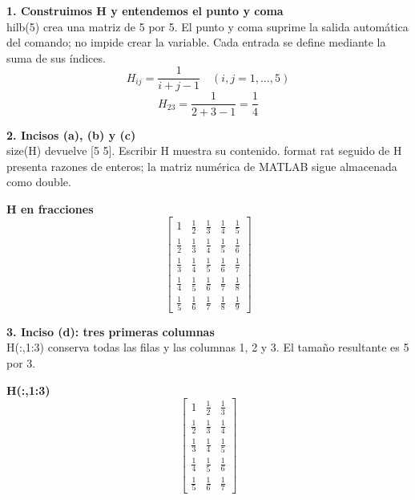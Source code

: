 \documentclass[11pt,a4paper,landscape]{article}
\begin{document}
\par\medskip
\noindent\begin{minipage}{\linewidth}\textbf{1. Construimos H y entendemos el punto y coma}\\[2pt]hilb(5) crea una matriz de 5 por 5. El punto y coma suprime la salida automática del comando; no impide crear la variable. Cada entrada se define mediante la suma de sus índices.
\[H_{ij}=\frac{1}{i+j-1}\quad(i,j=1,\ldots,5)\]
\[H_{23}=\frac{1}{2+3-1}=\frac14\]
\end{minipage}\par\medskip
\noindent\begin{minipage}{\linewidth}\textbf{2. Incisos (a), (b) y (c)}\\[2pt]size(H) devuelve [5 5]. Escribir H muestra su contenido. format rat seguido de H presenta razones de enteros; la matriz numérica de MATLAB sigue almacenada como double.
\par\smallskip \textbf{H en fracciones}\[\begin{bmatrix}1 & \frac{1}{2} & \frac{1}{3} & \frac{1}{4} & \frac{1}{5}\\\frac{1}{2} & \frac{1}{3} & \frac{1}{4} & \frac{1}{5} & \frac{1}{6}\\\frac{1}{3} & \frac{1}{4} & \frac{1}{5} & \frac{1}{6} & \frac{1}{7}\\\frac{1}{4} & \frac{1}{5} & \frac{1}{6} & \frac{1}{7} & \frac{1}{8}\\\frac{1}{5} & \frac{1}{6} & \frac{1}{7} & \frac{1}{8} & \frac{1}{9}\end{bmatrix}\]
\end{minipage}\par\medskip
\noindent\begin{minipage}{\linewidth}\textbf{3. Inciso (d): tres primeras columnas}\\[2pt]H(:,1:3) conserva todas las filas y las columnas 1, 2 y 3. El tamaño resultante es 5 por 3.
\par\smallskip \textbf{H(:,1:3)}\[\begin{bmatrix}1 & \frac{1}{2} & \frac{1}{3}\\\frac{1}{2} & \frac{1}{3} & \frac{1}{4}\\\frac{1}{3} & \frac{1}{4} & \frac{1}{5}\\\frac{1}{4} & \frac{1}{5} & \frac{1}{6}\\\frac{1}{5} & \frac{1}{6} & \frac{1}{7}\end{bmatrix}\]
\end{minipage}\par\medskip
\end{document}
